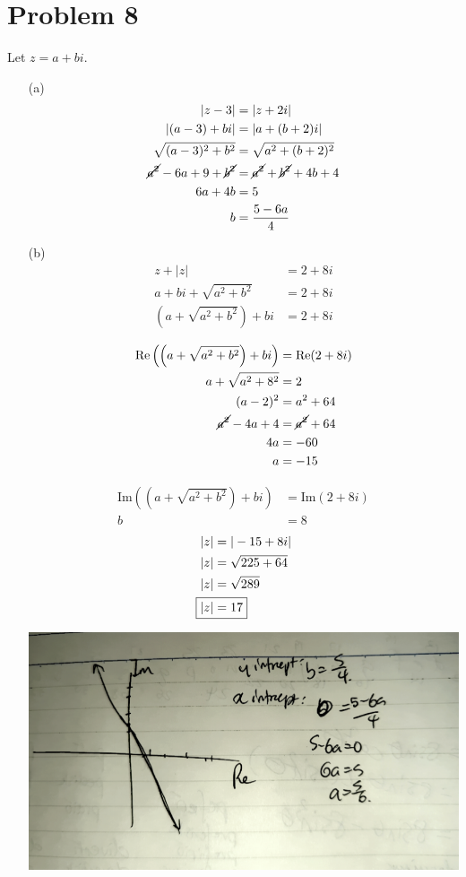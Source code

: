 \documentclass{article}
\renewcommand{\Re}{{\mathrm{Re}}}
\renewcommand{\Im}{{\mathrm{Im}}}
\begin{document}
\section*{Problem 8}
Let $z=a+bi$.
\begin{itemize}
\item[(a)]
	\begin{align*}
		|z-3|&=|z+2i| \\
		|(a-3)+bi|&=|a+(b+2)i| \\
		\sqrt{(a-3)^2+b^2}&=\sqrt{a^2+(b+2)^2} \\
		\cancel{a^2}-6a+9+\cancel{b^2}&=\cancel{a^2}+\cancel{b^2}+4b+4 \\
		6a+4b&=5 \\
		b&=\frac{5-6a}{4}
	\end{align*}

\item[(b)]
	\begin{align*}
		z+|z|&=2+8i \\
		a+bi+\sqrt{a^2+b^2}&=2+8i \\
		\left(a+\sqrt{a^2+b^2}\right)+bi&=2+8i
	\end{align*}
	\begin{minipage}[t]{0.5\linewidth}
		\begin{align*}
			\Re\left(\left(a+\sqrt{a^2+b^2}\right)+bi\right)&=\Re(2+8i) \\
			a+\sqrt{a^2+8^2}&=2 \\
			(a-2)^2&=a^2+64 \\
			\cancel{a^2}-4a+4&=\cancel{a^2}+64 \\
			4a&=-60 \\
			a&=-15
		\end{align*}
	\end{minipage}
	\begin{minipage}[t]{0.5\linewidth}
		\begin{align*}
			\Im\left(\left(a+\sqrt{a^2+b^2}\right)+bi\right)&=\Im(2+8i) \\
			b&=8
		\end{align*}
		\begin{align*}
			|z|&=|-15+8i| \\
			|z|&=\sqrt{225+64} \\
			|z|&=\sqrt{289} \\
			\Aboxed{|z|&=17}
		\end{align*}
	\end{minipage}

	\centering
	\includegraphics*[width=0.8\linewidth]{q8b.png}

	\justifying

\end{itemize}
\end{document}
